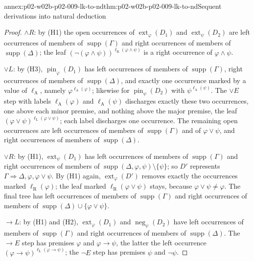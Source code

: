 \begin{annexitem}{annex:p02-w02b-p02-009-lk-to-nd}{thm:p02-w02b-p02-009-lk-to-nd}{Sequent derivations into natural deduction}
\begin{proof}
\(\land R\): by (H1) the open occurrences of
\(\operatorname{ext}_\varphi(D_1)\) and \(\operatorname{ext}_\psi(D_2)\) are
left occurrences of members of \(\operatorname{supp}(\Gamma)\) and right
occurrences of members of \(\operatorname{supp}(\Delta)\); the leaf
\((\neg(\varphi\land\psi))^{\ell_{\mathrm R}(\varphi\land\psi)}\) is a right
occurrence of \(\varphi\land\psi\).

\(\lor L\): by (H3), \(\operatorname{pin}_\varphi(D_1)\) has left occurrences
of members of \(\operatorname{supp}(\Gamma)\), right occurrences of members of
\(\operatorname{supp}(\Delta)\), and exactly one occurrence marked by a value
of \(\ell_{\mathrm A}\), namely \(\varphi^{\ell_{\mathrm A}(\varphi)}\);
likewise for \(\operatorname{pin}_\psi(D_2)\) with
\(\psi^{\ell_{\mathrm A}(\psi)}\).  The \(\lor E\) step with labels
\(\ell_{\mathrm A}(\varphi)\) and \(\ell_{\mathrm A}(\psi)\) discharges exactly
these two occurrences, one above each minor premise, and nothing above the
major premise, the leaf \((\varphi\lor\psi)^{\ell_{\mathrm L}(\varphi\lor\psi)}\);
each label discharges one occurrence.  The remaining open occurrences are
left occurrences of members of \(\operatorname{supp}(\Gamma)\) and of
\(\varphi\lor\psi\), and right occurrences of members of
\(\operatorname{supp}(\Delta)\).

\(\lor R\): by (H1), \(\operatorname{ext}_\psi(D_1)\) has left occurrences of
members of \(\operatorname{supp}(\Gamma)\) and right occurrences of members of
\(\operatorname{supp}(\Delta,\varphi,\psi)\setminus\{\psi\}\); so \(D'\)
represents \(\Gamma\Rightarrow\Delta,\varphi,\varphi\lor\psi\).  By (H1)
again, \(\operatorname{ext}_\varphi(D')\) removes exactly the occurrences
marked \(\ell_{\mathrm R}(\varphi)\); the leaf marked
\(\ell_{\mathrm R}(\varphi\lor\psi)\) stays, because
\(\varphi\lor\psi\neq\varphi\).  The final tree has left occurrences of
members of \(\operatorname{supp}(\Gamma)\) and right occurrences of members
of \(\operatorname{supp}(\Delta)\cup\{\varphi\lor\psi\}\).

\(\to L\): by (H1) and (H2), \(\operatorname{ext}_\varphi(D_1)\) and
\(\operatorname{neg}_\psi(D_2)\) have left occurrences of members of
\(\operatorname{supp}(\Gamma)\) and right occurrences of members of
\(\operatorname{supp}(\Delta)\).  The \(\to E\) step has premises
\(\varphi\) and \(\varphi\to\psi\), the latter the left occurrence
\((\varphi\to\psi)^{\ell_{\mathrm L}(\varphi\to\psi)}\); the \(\neg E\) step
has premises \(\psi\) and \(\neg\psi\).


\end{proof}
\end{annexitem}
